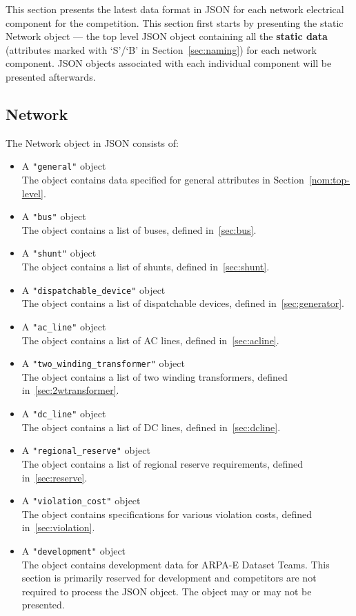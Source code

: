 This section presents the latest data format in JSON for 
each network electrical component for the competition.
This section first starts by presenting the static Network object ---
the top level JSON object containing all the \textbf{static data}
(attributes marked with `S'/`B' in Section~\ref{sec:naming}) for each network component.
JSON objects associated with each individual component will be presented afterwards.

\subsection{Network}
\label{sec:network}
The Network object in JSON consists of: 
\begin{itemize}
    \item A \texttt{"general"} object\\
    The object contains data specified for general attributes in Section~\ref{nom:top-level}.
    \item A \texttt{"bus"} object\\
    The object contains a list of buses, defined in~\ref{sec:bus}.
    \item A \texttt{"shunt"} object\\
    The object contains a list of shunts, defined in~\ref{sec:shunt}.
    \item A \texttt{"dispatchable\_device"} object\\
    The object contains a list of dispatchable devices, defined in~\ref{sec:generator}.
    \item A \texttt{"ac\_line"} object\\
    The object contains a list of AC lines, defined in~\ref{sec:acline}.
    \item A \texttt{"two\_winding\_transformer"} object\\
    The object contains a list of two winding transformers, defined in~\ref{sec:2wtransformer}.
    \item A \texttt{"dc\_line"} object\\
    The object contains a list of DC lines, defined in~\ref{sec:dcline}.
    \item A \texttt{"regional\_reserve"} object\\
    The object contains a list of regional reserve requirements, defined in~\ref{sec:reserve}.
    \item A \texttt{"violation\_cost"} object\\
    The object contains specifications for various violation costs, defined in~\ref{sec:violation}.
    \item A \texttt{"development"} object\\
    The object contains development data for ARPA-E Dataset Teams. This section is primarily reserved for development and competitors are not required to process the JSON object. The object may or may not be presented. 
\end{itemize}

